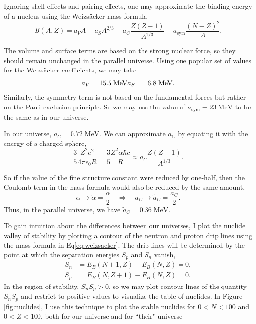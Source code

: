 \documentclass[%
 reprint,
 amsmath,amssymb,
 aps,
]{revtex4-1}
\begin{document}
Ignoring shell effects and pairing effects, one may approximate the binding energy of a nucleus using the Weizs\"acker mass formula\cite{1935ZPhy...96..431W}
\begin{equation}
	B(A, Z) = a_V A - a_S A^{2/3} - a_C \frac{Z (Z-1)}{A^{1/3}}
	- a_{\text{sym}} \frac{(N-Z)^2}{A}.
	\label{eq:weizsacker}
\end{equation}

The volume and surface terms are based on the strong nuclear force, so they should remain unchanged in the parallel universe. Using one popular set of values for the Weizs\"acker coefficients\cite{wong1990introductory}, we may take
\begin{equation}
	a_V = 15.5 \; \text{MeV} \\
	a_S = 16.8 \; \text{MeV}.
\end{equation}
Similarly, the symmetry term is not based on the fundamental forces but rather on the Pauli exclusion principle. So we may use the value of $a_{\text{sym}} = 23 \; \text{MeV}$ to be the same as in our universe.\cite{wong1990introductory}

In our universe, $a_C = 0.72 \; \text{MeV}$. We can approximate $a_C$ by equating it with the energy of a charged sphere,
\begin{equation}
	\frac{3}{5} \frac{Z^2 e^2}{4 \pi \epsilon_0 R} = 
	\frac{3}{5} \frac{Z^2 \alpha \hbar c}{R}
	\approx a_C \frac{Z(Z-1)}{A^{1/3}}.
\end{equation}

So if the value of the fine structure constant were reduced by one-half, then the Coulomb term in the mass formula would also be reduced by the same amount,
\begin{equation}
	\alpha \rightarrow \widetilde{\alpha} = \frac{\alpha}{2}
	\quad \Longrightarrow \quad
	a_C \rightarrow \widetilde{a}_C = \frac{a_C}{2}.
\end{equation}
Thus, in the parallel universe, we have $\widetilde{a}_C = 0.36 \; \text{MeV}$.

To gain intuition about the differences between our universes, I plot the nuclide valley of stability by plotting a contour of the neutron and proton drip lines using the mass formula in Eq\eqref{eq:weizsacker}. The drip lines will be determined by the point at which the separation energies $S_p$ and $S_n$ vanish,
\begin{align}
	S_n &= E_B(N+1, Z) - E_B(N, Z) = 0, \\
	S_p &= E_B(N, Z+1) - E_B(N, Z) = 0.
\end{align}
In the region of stability, $S_n S_p > 0$, so we may plot contour lines of the quantity $S_n S_p$ and restrict to positive values to visualize the table of nuclides. In Figure \ref{fig:nuclides}, I use this technique to plot the stable nuclides for $0 < N < 100$ and $0 < Z < 100$, both for our universe and for ``their" universe.
\end{document}
